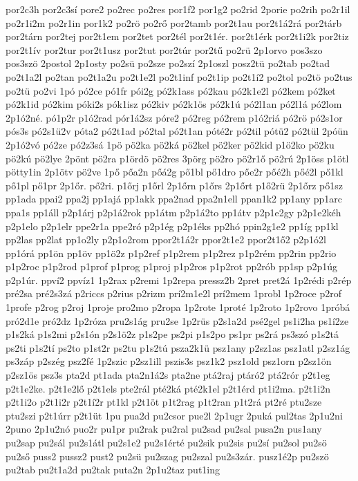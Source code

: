 {por2c3h
por2c3sí
pore2
po2rec
po2res
por1f2
por1g2
po2rid
2porie
po2rih
po2r1il
po2r1i2m
po2r1in
por1k2
po2rö
po2rő
por2tamb
por2t1au
por2t1á2rá
por2tárb
por2tárn
por2tej
por2t1em
por2tet
por2tél
por2t1ér.
por2t1érk
por2t1i2k
por2tiz
por2t1ív
por2tur
por2t1usz
por2tut
por2túr
por2tű
po2rü
2p1orvo
pos3szo
pos3szö
2postol
2p1osty
po2sü
po2sze
po2szí
2p1oszl
posz2tü
po2tab
po2tad
po2t1a2l
po2tan
po2t1a2u
po2t1e2l
po2t1inf
po2t1ip
po2t1í2
po2tol
po2tö
po2tus
po2tü
po2vi
1pó
pó2ce
pó1fr
pói2g
pó2k1ass
pó2kau
pó2k1e2l
pó2kem
pó2ket
pó2k1id
pó2kim
póki2s
pók1isz
pó2kiv
pó2k1ös
pó2k1ú
pó2l1an
pó2l1á
pó2lom
2p1ó2né.
pó1p2r
p1ó2rad
pór1á2sz
póre2
pó2reg
pó2rem
p1ó2riá
pó2rö
pó2s1or
pós3s
pó2s1ü2v
póta2
pó2t1ad
pó2tal
pó2t1an
póté2r
pó2til
pótü2
pó2tül
2póün
2p1ó2vó
pó2ze
pó2z3sá
1pö
pö2ka
pö2ká
pö2kel
pö2ker
pö2kid
p1ö2ko
pö2ku
pö2kú
pö2lye
2pönt
pö2ra
p1ördö
pö2res
3pörg
pö2ro
pö2r1ő
pö2rú
2p1öss
p1ötl
pötty1in
2p1ötv
pö2ve
1pő
pőa2n
pőá2g
pő1bl
pő1dro
pőe2r
pőé2h
pőé2l
pő1kl
pő1pl
pő1pr
2p1őr.
pő2ri.
p1őrj
p1őrl
2p1őrn
p1őrs
2p1őrt
p1ő2rü
2p1őrz
pő1sz
pp1ada
ppai2
ppa2j
pp1ajá
pp1akk
ppa2nad
ppa2n1ell
ppan1k2
pp1any
pp1arc
ppa1s
pp1áll
p2p1árj
p2p1á2rok
pp1átm
p2p1á2to
pp1átv
p2p1e2gy
p2p1e2kéh
p2p1elo
p2p1elr
ppe2r1a
ppe2ró
p2p1ég
p2p1éks
pp2hó
ppin2g1e2
pp1íg
pp1kl
pp2las
pp2lat
pp1o2ly
p2p1o2rom
ppor2t1á2r
ppor2t1e2
ppor2t1ő2
p2p1ó2l
pp1órá
pp1ön
pp1öv
pp1ö2z
p1p2ref
p1p2rem
p1p2rez
p1p2rém
pp2rin
pp2rio
p1p2roc
p1p2rod
p1prof
p1prog
p1proj
p1p2ros
p1p2rot
pp2rób
pp1sp
p2p1úg
p2p1úr.
ppví2
ppvíz1
1p2rax
p2remi
1p2repa
pressz2b
2pret
pret2á
1p2rédi
p2rép
pré2sa
pré2s3zá
p2riccs
p2rius
p2rizm
prí2m1e2l
prí2mem
1probl
1p2roce
p2rof
1profe
p2rog
p2roj
1proje
pro2mo
p2ropa
1p2rote
1proté
1p2roto
1p2rovo
1próbá
pró2d1e
pró2dz
1p2róza
pru2s1ág
pru2se
1p2rüs
p2s1a2d
psé2gel
ps1i2ha
ps1í2ze
p1s2ká
p1s2mi
p2s1ón
p2s1ö2z
p1s2pe
ps2pi
p1s2po
ps1pr
ps2rá
ps3szó
p1s2tá
ps2ti
p1s2tí
ps2to
p1st2r
ps2tu
p1s2tú
psza2k1ü
psz1any
p2sz1as
psz1atl
p2sz1ág
ps3záp
p2szég
psz2fé
1p2szic
p2sz1ill
pszis3s
psz1k2
psz1old
psz1orn
p2sz1ön
p2sz1ös
psz3s
pta2d
pt1ada
pta2n1á2s
pta2ne
ptá2raj
ptáró2
ptá2rór
p2t1eg
p2t1e2ke.
p2t1e2lő
p2t1els
pte2rál
pté2ká
pté2k1el
p2t1érd
pt1i2ma.
p2t1i2n
p2t1i2o
p2t1i2r
p2t1í2r
pt1kl
p2t1öt
p1t2rag
p1t2ran
p1t2rá
pt2ré
ptu2sze
ptu2szi
p2t1úrr
p2t1üt
1pu
pua2d
pu2csor
pue2l
2p1ugr
2puká
pul2tas
2p1u2ni
2puno
2p1u2nó
puo2r
pu1pr
pu2rak
pu2ral
pu2sad
pu2sal
pusa2n
pus1any
pu2sap
pu2sál
pu2s1átl
pu2s1e2
pu2s1érté
pu2sik
pu2sis
pu2sí
pu2sol
pu2sö
pu2ső
puss2
pussz2
pust2
pu2sü
pu2szag
pu2szal
pu2s3zár.
pusz1é2p
pu2szö
pu2tab
pu2t1a2d
pu2tak
puta2n
2p1u2taz
put1ing
}
